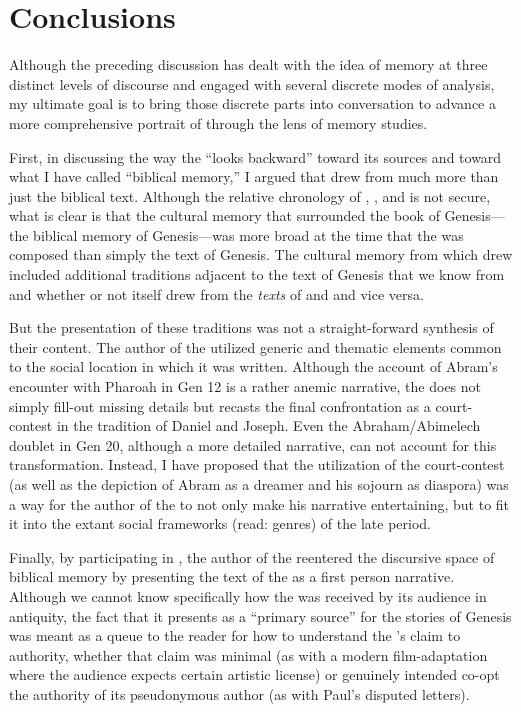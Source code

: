 \section{Conclusions}

Although the preceding discussion has dealt with the idea of memory at three distinct levels of discourse and engaged with several discrete modes of analysis, my ultimate goal is to bring those discrete parts into conversation to advance a more comprehensive portrait of \ga through the lens of memory studies.

First, in discussing the way the \ga ``looks backward'' toward its sources and toward what I have called ``biblical memory,'' I argued that \ga drew from much more than just the biblical text. Although the relative chronology of \firstenoch, \jub, and \ga is not secure, what is clear is that the cultural memory that surrounded the book of Genesis---the biblical memory of Genesis---was more broad at the time that the \ga was composed than simply the text of Genesis. The cultural memory from which \ga drew included additional traditions adjacent to the text of Genesis that we know from \jub and \firstenoch whether or not \ga itself drew from the \emph{texts} of \jub and \firstenoch and vice versa.

But the presentation of these traditions was not a straight-forward synthesis of their content. The author of the \ga utilized generic and thematic elements common to the social location in which it was written. Although the account of Abram's encounter with Pharoah in Gen 12 is a rather anemic narrative, the \ga does not simply fill-out missing details but recasts the final confrontation as a court-contest in the tradition of Daniel and Joseph. Even the Abraham/Abimelech doublet in Gen 20, although a more detailed narrative, can not account for this transformation. Instead, I have proposed that the utilization of the court-contest (as well as the depiction of Abram as a dreamer and his sojourn as diaspora) was a way for the author of the \ga to not only make his narrative entertaining, but to fit it into the extant social frameworks (read: genres) of the late \secondtemple period.

Finally, by participating in \psy, the author of the \ga reentered the discursive space of biblical memory by presenting the text of the \ga as a first person narrative. Although we cannot know specifically how the \ga was received by its audience in antiquity, the fact that it presents as a ``primary source'' for the stories of Genesis was meant as a queue to the reader for how to understand the \ga's claim to authority, whether that claim was minimal (as with a modern film-adaptation where the audience expects certain artistic license) or genuinely intended co-opt the authority of its pseudonymous author (as with Paul's disputed letters).

